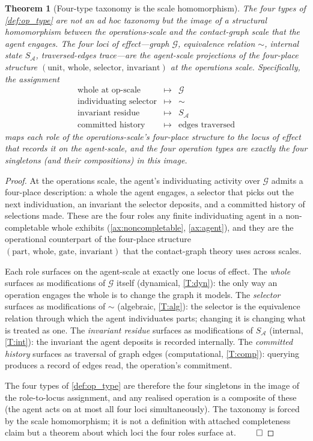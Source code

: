 \documentclass[11pt,twocolumn,a4paper]{article}
\theoremstyle{thmstyle}
\newtheorem{theorem}{Theorem}[section]
\theoremstyle{definition}
\theoremstyle{remark}
\newcommand{\Graph}{\mathcal{G}}
\newcommand{\Agent}{\mathcal{A}}
\begin{document}
\begin{theorem}[Four-type taxonomy is the scale homomorphism]
\label{thm:scale_homomorphism}
The four types of \cref{def:op_type} are not an ad hoc taxonomy
but the image of a structural homomorphism between the
operations-scale and the contact-graph scale that the agent
engages. The four loci of effect---graph $\Graph$, equivalence
relation $\sim$, internal state $S_\Agent$, traversed-edges
trace---are the agent-scale projections of the four-place
structure $(\text{unit},\,\text{whole},\,\text{selector},\,\text{
invariant})$ at the operations scale. Specifically, the assignment
\[
  \begin{array}{rcl}
  \text{whole at op-scale} & \longmapsto & \Graph \\
  \text{individuating selector} & \longmapsto & \sim \\
  \text{invariant residue} & \longmapsto & S_\Agent \\
  \text{committed history} & \longmapsto & \text{edges traversed}
  \end{array}
\]
maps each role of the operations-scale's four-place structure to
the locus of effect that records it on the agent-scale, and the
four operation types are exactly the four singletons (and their
compositions) in this image.
\end{theorem}

\begin{proof}
At the operations scale, the agent's individuating activity over
$\Graph$ admits a four-place description: a whole the agent
engages, a selector that picks out the next individuation, an
invariant the selector deposits, and a committed history of
selections made. These are the four roles any finite individuating
agent in a non-completable whole exhibits
(\cref{ax:noncompletable}, \cref{ax:agent}), and they are the
operational counterpart of the four-place structure
$(\text{part},\,\text{whole},\,\text{gate},\,\text{invariant})$
that the contact-graph theory uses across scales.

Each role surfaces on the agent-scale at exactly one locus of
effect. The \emph{whole} surfaces as modifications of $\Graph$
itself (dynamical, \ref{T:dyn}): the only way an operation engages
the whole is to change the graph it models. The \emph{selector}
surfaces as modifications of $\sim$ (algebraic, \ref{T:alg}): the
selector is the equivalence relation through which the agent
individuates parts; changing it is changing what is treated as one.
The \emph{invariant residue} surfaces as modifications of
$S_\Agent$ (internal, \ref{T:int}): the invariant the agent
deposits is recorded internally. The \emph{committed history}
surfaces as traversal of graph edges (computational, \ref{T:comp}):
querying produces a record of edges read, the operation's commitment.

The four types of \cref{def:op_type} are therefore the four
singletons in the image of the role-to-locus assignment, and any
realised operation is a composite of these (the agent acts on at
most all four loci simultaneously). The taxonomy is forced by the
scale homomorphism; it is not a definition with attached
completeness claim but a theorem about which loci the four roles
surface at. $\qed$
\end{proof}
\end{document}
